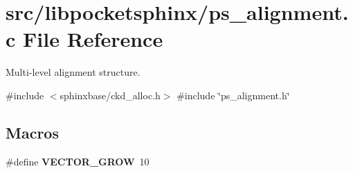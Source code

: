 \section{src/libpocketsphinx/ps\+\_\+alignment.c File Reference}
\label{ps__alignment_8c}


Multi-\/level alignment structure.  


{\ttfamily \#include $<$sphinxbase/ckd\+\_\+alloc.\+h$>$}\newline
{\ttfamily \#include \char`\"{}ps\+\_\+alignment.\+h\char`\"{}}\newline
\subsection*{Macros}
\begin{DoxyCompactItemize}
\item 
\mbox{\label{ps__alignment_8c_af4a1705d5cc1103ccf95a9b5401d4c6e}} 
\#define {\bfseries V\+E\+C\+T\+O\+R\+\_\+\+G\+R\+OW}~10
\end{DoxyCompactItemize}
